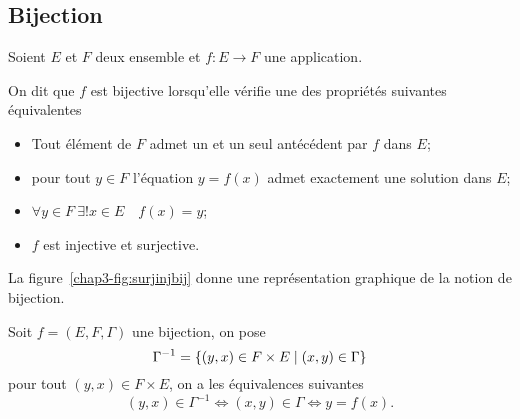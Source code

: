 \subsection{Bijection}
\label{chap3-subsubsec:bijection}
Soient \(E\) et \(F\) deux ensemble et \(f:E \longrightarrow F\) une application.
\begin{defdef}
  On dit que \(f\) est bijective lorsqu'elle vérifie une des propriétés suivantes équivalentes
  \begin{itemize}
  \item Tout élément de \(F\) admet un et un seul antécédent par \(f\) dans \(E\);
  \item pour tout \(y \in F\) l'équation \(y=f(x)\) admet exactement une solution dans \(E\);
  \item \(\forall y \in F \ \exists! x \in E \quad f(x)=y\);
  \item \(f\) est injective et surjective.
  \end{itemize}
La figure~\ref{chap3-fig:surjinjbij} donne une représentation graphique de la notion de bijection.
\end{defdef}
%
Soit \(f=(E,F,\Gamma)\) une bijection, on pose 
\begin{equation}
\Gamma^{-1}=\left\{(y,x) \in F \times E\mathrel{}\middle|\mathrel{}(x,y) \in \Gamma\right\}
\end{equation}
pour tout \((y,x) \in F \times E\), on a les équivalences suivantes
\begin{equation}
  (y,x) \in \Gamma^{-1} \iff (x,y) \in \Gamma \iff y=f(x).
\end{equation}

